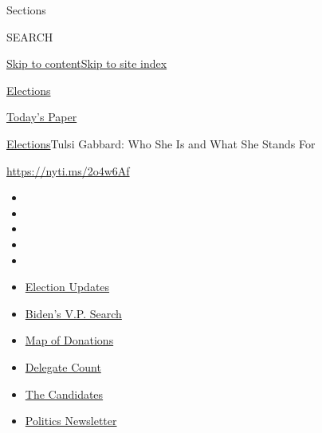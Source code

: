 Sections

SEARCH

\protect\hyperlink{site-content}{Skip to
content}\protect\hyperlink{site-index}{Skip to site index}

\href{https://www.nytimes.com/news-event/2020-election}{Elections}

\href{https://myaccount.nytimes.com/auth/login?response_type=cookie\&client_id=vi}{}

\href{https://www.nytimes.com/section/todayspaper}{Today's Paper}

\href{/news-event/2020-election}{Elections}\textbar{}Tulsi Gabbard: Who
She Is and What She Stands For

\url{https://nyti.ms/2o4w6Af}

\begin{itemize}
\item
\item
\item
\item
\item
\end{itemize}

\begin{itemize}
\item
  \href{https://www.nytimes.com/2020/07/31/us/elections/biden-vs-trump.html?action=click\&pgtype=Article\&state=default\&region=TOP_BANNER\&context=storylines_menu}{Election
  Updates}
\item
  \href{https://www.nytimes.com/article/biden-vice-president-2020.html?action=click\&pgtype=Article\&state=default\&region=TOP_BANNER\&context=storylines_menu}{Biden's
  V.P. Search}
\item
  \href{https://www.nytimes.com/interactive/2020/07/24/us/politics/trump-biden-campaign-donors.html?action=click\&pgtype=Article\&state=default\&region=TOP_BANNER\&context=storylines_menu}{Map
  of Donations}
\item
  \href{https://www.nytimes.com/interactive/2020/us/elections/delegate-count-primary-results.html?action=click\&pgtype=Article\&state=default\&region=TOP_BANNER\&context=storylines_menu}{Delegate
  Count}
\item
  \href{https://www.nytimes.com/interactive/2019/us/politics/2020-presidential-candidates.html?action=click\&pgtype=Article\&state=default\&region=TOP_BANNER\&context=storylines_menu}{The
  Candidates}
\item
  \href{https://www.nytimes.com/newsletters/politics?action=click\&pgtype=Article\&state=default\&region=TOP_BANNER\&context=storylines_menu}{Politics
  Newsletter}
\end{itemize}

